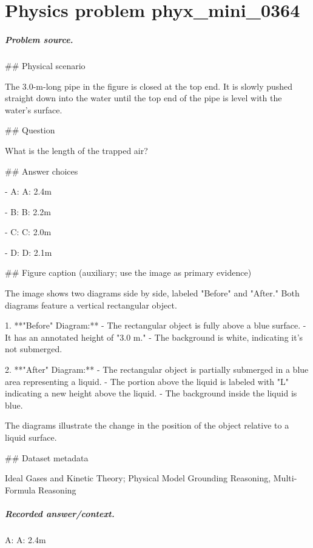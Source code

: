 
\chapter{Physics problem phyx\_mini\_0364}
\label{ch:PhyXMiniProblems_problem_phyx_mini_0364}

\paragraph{Problem source.}
\#\# Physical scenario

The 3.0-m-long pipe in the figure is closed at the top end. It is slowly pushed straight down into the water until the top end of the pipe is level with the water’s surface.

\#\# Question

What is the length of the trapped air?

\#\# Answer choices

- A: A: 2.4m

- B: B: 2.2m

- C: C: 2.0m

- D: D: 2.1m

\#\# Figure caption (auxiliary; use the image as primary evidence)

The image shows two diagrams side by side, labeled "Before" and "After." Both diagrams feature a vertical rectangular object. 

1. **"Before" Diagram:**
   - The rectangular object is fully above a blue surface.
   - It has an annotated height of "3.0 m."
   - The background is white, indicating it's not submerged.

2. **"After" Diagram:**
   - The rectangular object is partially submerged in a blue area representing a liquid.
   - The portion above the liquid is labeled with "L" indicating a new height above the liquid.
   - The background inside the liquid is blue.

The diagrams illustrate the change in the position of the object relative to a liquid surface.

\#\# Dataset metadata

Ideal Gases and Kinetic Theory; Physical Model Grounding Reasoning, Multi-Formula Reasoning

\paragraph{Recorded answer/context.}
A: A: 2.4m


